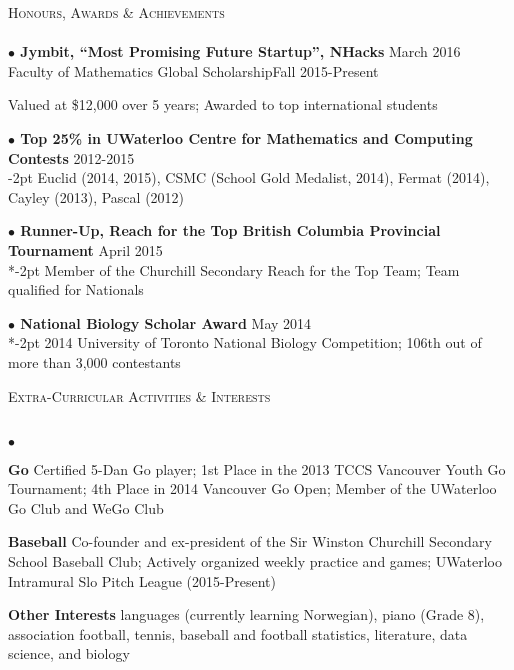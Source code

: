 \documentclass{article}
\newcommand{\lineunder}{\vspace*{-8pt} \\ \hspace*{-18pt} \hrulefill \\}
\newcommand{\header}[1]{{\hspace*{-15pt}\vspace*{6pt} \textsc{#1}} \vspace*{-6pt} \lineunder}
\newenvironment{achievements}{\begin{list}{$\bullet$}{\topsep 0pt \itemsep -2pt}}{\vspace*{4pt}\end{list}}
\newcommand{\award}[3]{\hspace{12pt} \textbf{$\bullet$ \hspace{2bp}#1} \hfill{#2} \\ \vspace{2pt}
}
\begin{document}
\header{Honours, Awards \& Achievements}

\award {Jymbit, ``Most Promising Future Startup'', NHacks}{March 2016}

\award {Faculty of Mathematics Global Scholarship}{Fall 2015-Present}

\vspace{-2pt}
\hspace{22bp}
Valued at \$12,000 over 5 years; Awarded to top international students

\award{Top 25\% in UWaterloo Centre for Mathematics and Computing Contests}{2012-2015}

\vspace{-2pt}
\hspace{22bp}
Euclid (2014, 2015), CSMC (School Gold Medalist, 2014), Fermat (2014), Cayley (2013), Pascal (2012)

\award{Runner-Up, Reach for the Top British Columbia Provincial Tournament}{April 2015}

\vspace*{-2pt}
\hspace{22bp}
Member of the Churchill Secondary Reach for the Top Team; Team qualified for Nationals

\award{National Biology Scholar Award}{May 2014}

\vspace*{-2pt}
\hspace{22bp}
2014 University of Toronto National Biology Competition; 106th out of more than 3,000 contestants

\vspace*{5pt}

\header{Extra-Curricular Activities \& Interests}
\begin{achievements}
\item \textbf{Go} \hspace{3bp}Certified 5-Dan Go player; 1st Place in the 2013 TCCS Vancouver Youth Go Tournament; 4th Place in 2014 Vancouver Go Open; Member of the UWaterloo Go Club and WeGo Club
\item \textbf{Baseball}	\hspace{3bp}Co-founder and ex-president of the Sir Winston Churchill Secondary School Baseball Club; Actively organized weekly practice and games; UWaterloo Intramural Slo Pitch League (2015-Present)
\item \textbf{Other Interests} \hspace{3bp}languages (currently learning Norwegian), piano (Grade 8), association football, tennis, baseball and football statistics, literature, data science, and biology
\end{achievements}
\end{document}
